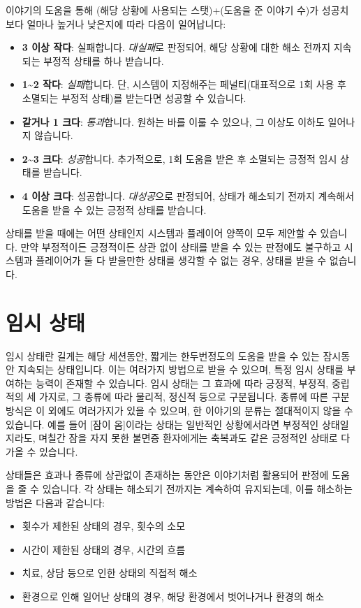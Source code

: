 \documentclass{report}
\begin{document}
	이야기의 도움을 통해 (해당 상황에 사용되는 스탯)+(도움을 준 이야기 수)가 성공치보다 얼마나 높거나 낮은지에 따라 다음이 일어납니다:
	\begin{itemize}
		\item \textbf{3 이상 작다}: 실패합니다. \emph{대실패}로 판정되어, 해당 상황에 대한 해소 전까지 지속되는 부정적 상태를 하나 받습니다.
		\item \textbf{1\textasciitilde2 작다}: \emph{실패}합니다. 단, 시스템이 지정해주는 페널티(대표적으로 1회 사용 후 소멸되는 부정적 상태)를 받는다면 성공할 수 있습니다.
		\item \textbf{같거나 1 크다}: \emph{통과}합니다. 원하는 바를 이룰 수 있으나, 그 이상도 이하도 일어나지 않습니다.
		\item \textbf{2\textasciitilde3 크다}: \emph{성공}합니다. 추가적으로, 1회 도움을 받은 후 소멸되는 긍정적 임시 상태를 받습니다.
		\item \textbf{4 이상 크다}: 성공합니다. \emph{대성공}으로 판정되어, 상태가 해소되기 전까지 계속해서 도움을 받을 수 있는 긍정적 상태를 받습니다.
	\end{itemize}
	상태를 받을 때에는 어떤 상태인지 시스템과 플레이어 양쪽이 모두 제안할 수 있습니다. 만약 부정적이든 긍정적이든 상관 없이 상태를 받을 수 있는 판정에도 불구하고 시스템과 플레이어가 둘 다 받을만한 상태를 생각할 수 없는 경우, 상태를 받을 수 없습니다.
	
	\section*{임시 상태}
	임시 상태란 길게는 해당 세션동안, 짧게는 한두번정도의 도움을 받을 수 있는 잠시동안 지속되는 상태입니다. 이는 여러가지 방법으로 받을 수 있으며, 특정 임시 상태를 부여하는 능력이 존재할 수 있습니다. 임시 상태는 그 효과에 따라 긍정적, 부정적, 중립적의 세 가지로, 그 종류에 따라 물리적, 정신적 등으로 구분됩니다. 종류에 따른 구분 방식은 이 외에도 여러가지가 있을 수 있으며, 한 이야기의 분류는 절대적이지 않을 수 있습니다. 예를 들어 [잠이 옴]이라는 상태는 일반적인 상황에서라면 부정적인 상태일지라도, 며칠간 잠을 자지 못한 불면증 환자에게는 축복과도 같은 긍정적인 상태로 다가올 수 있습니다.
	
	상태들은 효과나 종류에 상관없이 존재하는 동안은 이야기처럼 활용되어 판정에 도움을 줄 수 있습니다. 각 상태는 해소되기 전까지는 계속하여 유지되는데, 이를 해소하는 방법은 다음과 같습니다:
	\begin{itemize}
		\item 횟수가 제한된 상태의 경우, 횟수의 소모
		\item 시간이 제한된 상태의 경우, 시간의 흐름
		\item 치료, 상담 등으로 인한 상태의 직접적 해소
		\item 환경으로 인해 일어난 상태의 경우, 해당 환경에서 벗어나거나 환경의 해소
	\end{itemize}
	
\end{document}
